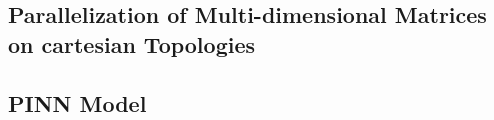 \subsection{Parallelization of Multi-dimensional Matrices on cartesian Topologies}




\subsection{PINN Model}
